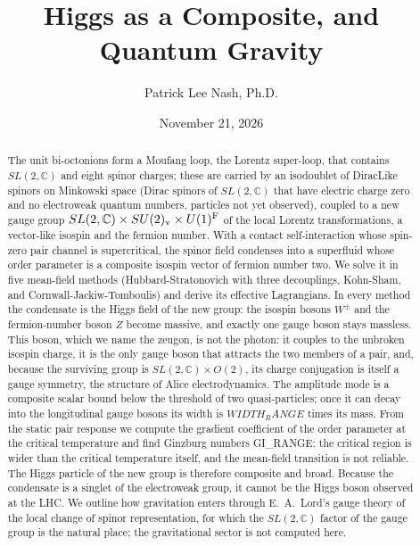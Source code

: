 \documentclass[aps,prd,twocolumn,superscriptaddress,nofootinbib,floatfix,longbibliography]{revtex4-2}
\begin{document}
\title{Higgs as a Composite, and Quantum Gravity}

\author{Patrick Lee Nash, Ph.D.}

\date{November 21, 2026}

\begin{abstract}
The unit bi-octonions form a Moufang loop, the Lorentz super-loop, that contains $SL(2,\mathbb C)$ and eight spinor
charges; these are carried by an isodoublet of DiracLike spinors on Minkowski space (Dirac spinors of $SL(2,\mathbb C)$
that have electric charge zero and no electroweak quantum numbers, particles not yet observed), coupled to a new gauge
group $SL(2,\mathbb C)\times SU(2)_{\rm v}\times U(1)^{\rm F}$ of the local Lorentz transformations, a vector-like isospin and
the fermion number. With a contact self-interaction whose spin-zero pair channel is supercritical, the spinor field
condenses into a superfluid whose order parameter is a composite isospin vector of fermion number two. We solve it in
five mean-field methods (Hubbard-Stratonovich with three decouplings, Kohn-Sham, and Cornwall-Jackiw-Tomboulis) and
derive its effective Lagrangians. In every method the condensate is the Higgs field of the new group: the isospin bosons
$W^\pm$ and the fermion-number boson $Z$ become massive, and exactly one gauge boson stays massless. This boson, which we
name the zeugon, is not the photon: it couples to the unbroken isospin charge, it is the only gauge boson that attracts
the two members of a pair, and, because the surviving group is $SL(2,\mathbb C)\times O(2)$, its charge conjugation is
itself a gauge symmetry, the structure of Alice electrodynamics. The amplitude mode is a composite scalar bound below
the threshold of two quasi-particles; once it can decay into the longitudinal gauge bosons its width is ${{WIDTH_RANGE}}$
times its mass. From the static pair response we compute the gradient coefficient of the order parameter at the critical
temperature and find Ginzburg numbers {{GI_RANGE}}: the critical region is wider than the critical temperature itself,
and the mean-field transition is not reliable. The Higgs particle of the new group is therefore composite and broad.
Because the condensate is a singlet of the electroweak group, it cannot be the Higgs boson observed at the LHC. We outline
how gravitation enters through E.~A.~Lord's gauge theory of the local change of spinor representation, for which the
$SL(2,\mathbb C)$ factor of the gauge group is the natural place; the gravitational sector is not computed here.
\end{abstract}
\end{document}
